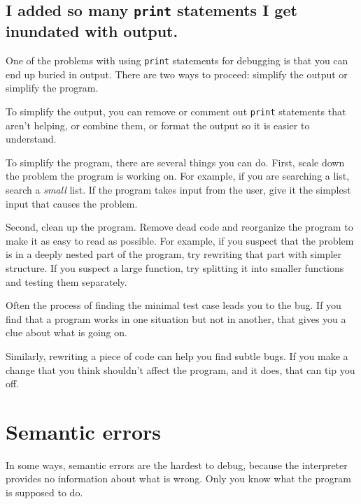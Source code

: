 \documentclass[10pt]{book}
\begin{document}
{\subsection{I added so many {\tt print} statements I get inundated with
output.}


One of the problems with using {\tt print} statements for debugging
is that you can end up buried in output.  There are two ways
to proceed: simplify the output or simplify the program.

To simplify the output, you can remove or comment out {\tt print}
statements that aren't helping, or combine them, or format
the output so it is easier to understand.

To simplify the program, there are several things you can do.  First,
scale down the problem the program is working on.  For example, if you
are searching a list, search a {\em small} list.  If the program takes
input from the user, give it the simplest input that causes the
problem.


Second, clean up the program.  Remove dead code and reorganize the
program to make it as easy to read as possible.  For example, if you
suspect that the problem is in a deeply nested part of the program,
try rewriting that part with simpler structure.  If you suspect a
large function, try splitting it into smaller functions and testing them
separately.


Often the process of finding the minimal test case leads you to the
bug.  If you find that a program works in one situation but not in
another, that gives you a clue about what is going on.

Similarly, rewriting a piece of code can help you find subtle
bugs.  If you make a change that you think shouldn't affect the
program, and it does, that can tip you off.


\section{Semantic errors}

In some ways, semantic errors are the hardest to debug,
because the interpreter provides no information
about what is wrong.  Only you know what the program is supposed to
do.

}
\end{document}
